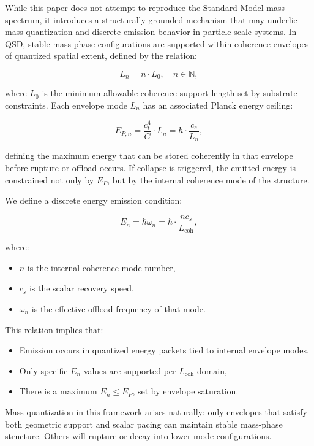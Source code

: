 \documentclass[entropy,article,submit,pdftex,moreauthors]{Definitions/mdpi}
\begin{document}
While this paper does not attempt to reproduce the Standard Model mass spectrum, it introduces a structurally grounded mechanism that may underlie mass quantization and discrete emission behavior in particle-scale systems. In QSD, stable mass-phase configurations are supported within coherence envelopes of quantized spatial extent, defined by the relation:

\begin{equation}
L_n = n \cdot L_0, \quad n \in \mathbb{N},
\end{equation}

where $L_0$ is the minimum allowable coherence support length set by substrate constraints. Each envelope mode $L_n$ has an associated Planck energy ceiling:

\begin{equation}
E_{P,n} = \frac{c_t^4}{G} \cdot L_n = \hbar \cdot \frac{c_s}{L_n},
\end{equation}

defining the maximum energy that can be stored coherently in that envelope before rupture or offload occurs. If collapse is triggered, the emitted energy is constrained not only by $E_P$, but by the internal coherence mode of the structure.

We define a discrete energy emission condition:

\begin{equation}
E_n = \hbar \omega_n = \hbar \cdot \frac{n c_s}{L_{\text{coh}}},
\end{equation}

where:
\begin{itemize}
  \item $n$ is the internal coherence mode number,
  \item $c_s$ is the scalar recovery speed,
  \item $\omega_n$ is the effective offload frequency of that mode.
\end{itemize}

This relation implies that:
\begin{itemize}
  \item Emission occurs in quantized energy packets tied to internal envelope modes,
  \item Only specific $E_n$ values are supported per $L_{\text{coh}}$ domain,
  \item There is a maximum $E_n \leq E_P$, set by envelope saturation.
\end{itemize}

Mass quantization in this framework arises naturally: only envelopes that satisfy both geometric support and scalar pacing can maintain stable mass-phase structure. Others will rupture or decay into lower-mode configurations.
\end{document}
